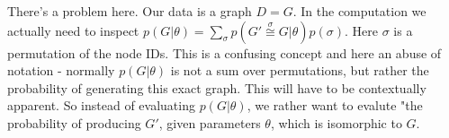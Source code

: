There's a problem here. Our data is a graph $D=G$. In the computation we actually need to inspect $p(G | \theta) = \sum_{\sigma} p(G' \stackrel{\sigma}{\cong} G | \theta) p(\sigma)$. Here $\sigma$ is a permutation of the node IDs. This is a confusing concept and here an abuse of notation - normally $p(G | \theta)$ is not a sum over permutations, but rather the probability of generating this exact graph. This will have to be contextually apparent. So instead of evaluating $p(G | \theta)$, we rather want to evalute "the probability of producing $G'$, given parameters $\theta$, which is isomorphic to $G$.




  
  

